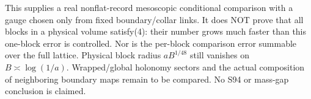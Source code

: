 \documentclass{article}
\begin{document}
This supplies a real nonflat-record mesoscopic conditional comparison with a gauge chosen only from fixed boundary/collar links. It does NOT prove that all blocks in a physical volume satisfy(4): their number grows much faster than this one-block error is controlled. Nor is the per-block comparison error summable over the full lattice. Physical block radius $aB^{1/48}$ still vanishes on $B\asymp\log(1/a)$. Wrapped/global holonomy sectors and the actual composition of neighboring boundary maps remain to be compared. No S94 or mass-gap conclusion is claimed.
\end{document}
